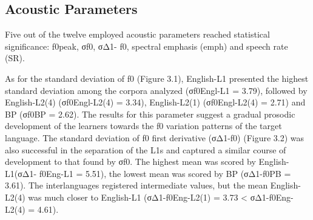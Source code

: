 \subsection{Acoustic Parameters}
Five out of the twelve employed acoustic parameters reached statistical
significance: f0peak, σf0, σΔ1- f0, spectral emphasis (emph) and speech rate
(SR). 

As for the standard deviation of f0 (Figure 3.1), English-L1 presented the
highest standard deviation among the corpora analyzed (σf0Engl-L1 = 3.79),
followed by English-L2(4) (σf0Engl-L2(4) = 3.34), English-L2(1) (σf0Engl-L2(4)
= 2.71) and BP (σf0BP  = 2.62). The results for this parameter suggest a
gradual prosodic development of the learners towards the f0 variation patterns
of the target language. The standard deviation of f0 first derivative (σΔ1-f0)
(Figure 3.2) was also successful in the separation of the L1s and captured a
similar course of development to that found by σf0. The highest mean was scored
by English-L1(σΔ1- f0Eng-L1 = 5.51), the lowest mean was scored by BP (σΔ1-f0PB
= 3.61). The interlanguages registered intermediate values, but the mean
English-L2(4) was much closer to English-L1 (σΔ1-f0Eng-L2(1) = 3.73 <
σΔ1-f0Eng-L2(4) = 4.61).


